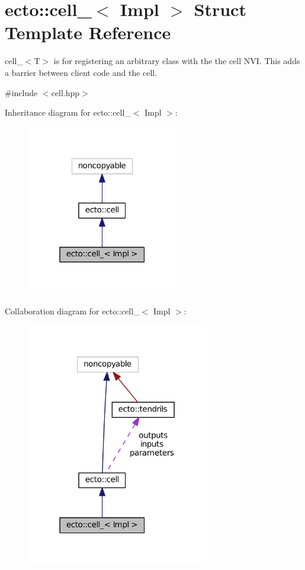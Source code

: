 \hypertarget{structecto_1_1cell__}{}\section{ecto\+:\+:cell\+\_\+$<$ Impl $>$ Struct Template Reference}
\label{structecto_1_1cell__}


cell\+\_\+$<$\+T$>$ is for registering an arbitrary class with the the cell N\+V\+I. This adds a barrier between client code and the cell.  




{\ttfamily \#include $<$cell.\+hpp$>$}



Inheritance diagram for ecto\+:\+:cell\+\_\+$<$ Impl $>$\+:\nopagebreak
\begin{figure}[H]
\begin{center}
\leavevmode
\includegraphics[width=187pt]{structecto_1_1cell____inherit__graph}
\end{center}
\end{figure}


Collaboration diagram for ecto\+:\+:cell\+\_\+$<$ Impl $>$\+:\nopagebreak
\begin{figure}[H]
\begin{center}
\leavevmode
\includegraphics[width=226pt]{structecto_1_1cell____coll__graph}
\end{center}
\end{figure}

